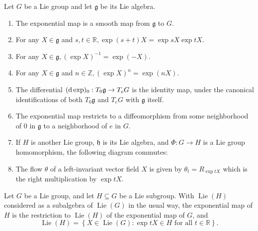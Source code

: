 \begin{proposition}
  \label{proposition-propertie-of-the-exponential-map}
  Let \( G \) be a Lie group and let \( \mathfrak{g} \) be its Lie algebra.
  \begin{enumerate}
    \item The exponential map is a smooth map from \( \mathfrak{g} \) to \( G \).
    \item For any \( X \in \mathfrak{g} \) and \( s, t \in \mathbb{R}, \exp(s + t)X = \exp sX \exp tX \).
    \item For any \( X \in \mathfrak{g}, (\exp X)^{-1} = \exp(-X) \).
    \item For any \( X \in \mathfrak{g} \) and \( n \in \mathbb{Z}, (\exp X)^n = \exp(nX) \).
    \item The differential \( (\mathop{}\!\mathrm{d} \exp)_0: T_0 \mathfrak{g} \to T_e G \) is the identity map, under the canonical identifications of both \( T_0 \mathfrak{g} \) and \( T_e G \) with \( \mathfrak{g} \) itself.
    \item The exponential map restricts to a diffeomorphism from some neighborhood of \( 0 \) in \( \mathfrak{g} \) to a neighborhood of \( e \) in \( G \).
    \item If \( H \) is another Lie group, \( \mathfrak{h} \) is its Lie algebra, and \( \Phi: G \to H \) is a Lie group homomorphism, the following diagram commutes:
    \begin{center}
    \end{center}
  \item The flow \( \theta \) of a left-invariant vector field \( X \) is given by \( \theta_t = R_{\exp tX} \) which is the right multiplication by \( \exp tX \).
  \end{enumerate}
\end{proposition}

\begin{proposition}
  \label{proposition-Lie-subalgebra-description}
  Let \( G \) be a Lie group, and let \( H \subseteq G \) be a Lie subgroup.
  With \( \operatorname{Lie}(H) \) considered as a subalgebra of \( \operatorname{Lie}(G) \) in the usual way, the exponential map of \( H \) is the restriction to \( \operatorname{Lie}(H) \) of the exponential map of \( G \), and
  \[
    \operatorname{Lie}(H) = \left\lbrace X \in \operatorname{Lie}(G): \exp tX \in H \text{ for all } t \in \mathbb{R} \right\rbrace.
  \]
\end{proposition}


